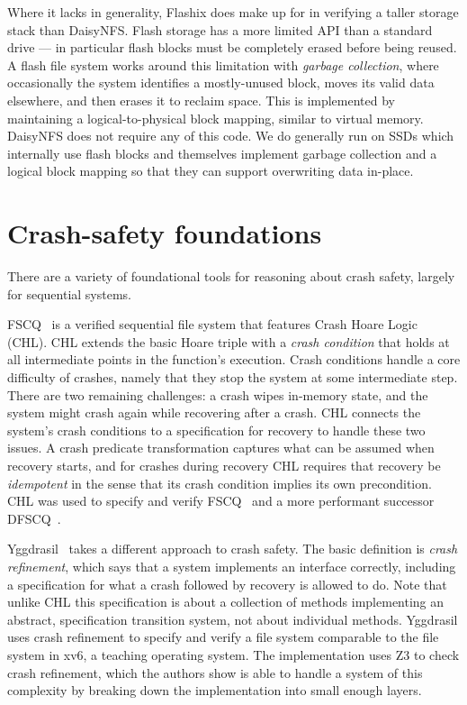 Where it lacks in generality, Flashix does make up for in verifying a taller
storage stack than DaisyNFS. Flash storage has a more limited API than a
standard drive --- in particular flash blocks must be completely erased before
being reused. A flash file system works around this limitation with \emph{garbage
collection}, where occasionally the system identifies a mostly-unused block,
moves its valid data elsewhere, and then erases it to reclaim space. This is
implemented by maintaining a logical-to-physical block mapping, similar to
virtual memory. DaisyNFS does not require any of this code. We do generally run
on SSDs which internally use flash blocks and themselves implement garbage
collection and a logical block mapping so that they can support overwriting data
in-place.

\section{Crash-safety foundations}

There are a variety of foundational tools for reasoning about crash safety,
largely for sequential systems.

FSCQ~\cite{chen:fscq,chen:dfscq,hchen-phd} is a verified sequential file
system that features Crash Hoare Logic (CHL). CHL extends the basic Hoare triple
with a \emph{crash condition} that holds at all intermediate points in the
function's execution. Crash conditions handle a core difficulty of crashes,
namely that they stop the system at some intermediate step. There are two
remaining challenges: a crash wipes in-memory state, and the system might crash again
while recovering after a crash. CHL connects the system's crash conditions to a
specification for recovery to handle these two issues. A crash predicate
transformation captures what can be assumed when recovery starts, and for
crashes during recovery CHL requires that recovery be \emph{idempotent} in the
sense that its crash condition implies its own precondition. CHL was used to
specify and verify FSCQ~\cite{chen:fscq} and a more performant successor
DFSCQ~\cite{chen:dfscq}.

Yggdrasil~\cite{sigurbjarnarson:yggdrasil} takes a different approach to crash
safety. The basic definition is \emph{crash refinement}, which says that a
system implements an interface correctly, including a specification for what a
crash followed by recovery is allowed to do. Note that unlike CHL this
specification is about a collection of methods implementing an abstract,
specification transition system, not about individual methods. Yggdrasil uses
crash refinement to specify and verify a file system comparable to the file
system in xv6, a teaching operating system. The implementation uses Z3 to check
crash refinement, which the authors show is able to handle a system of this
complexity by breaking down the implementation into small enough layers.

